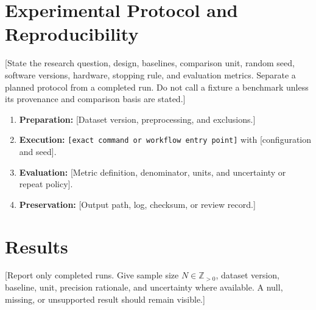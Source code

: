\documentclass[10pt,a4paper]{article}
\begin{document}
\section{Experimental Protocol and Reproducibility}
[State the research question, design, baselines, comparison unit, random seed,
  software versions, hardware, stopping rule, and evaluation
  metrics. Separate a
  planned protocol from a completed run. Do not call a fixture a
  benchmark unless
its provenance and comparison basis are stated.]

\begin{enumerate}
  \item \textbf{Preparation:} [Dataset version, preprocessing, and exclusions.]
  \item \textbf{Execution:} \texttt{[exact command or workflow entry point]}
    with [configuration and seed].
  \item \textbf{Evaluation:} [Metric definition, denominator, units, and
    uncertainty or repeat policy].
  \item \textbf{Preservation:} [Output path, log, checksum, or review record.]
\end{enumerate}

\section{Results}
[Report only completed runs. Give sample size $N \in \mathbb{Z}_{>0}$, dataset
  version, baseline, unit, precision rationale, and uncertainty
  where available.
A null, missing, or unsupported result should remain visible.]
\end{document}
